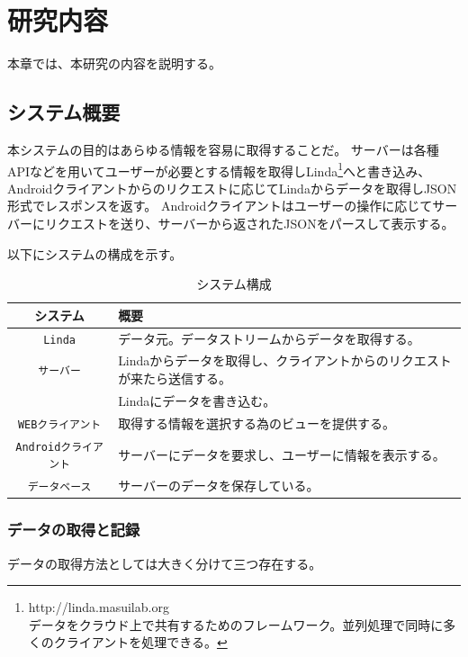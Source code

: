 \chapter{研究内容}
\label{chap:contents}

本章では、本研究の内容を説明する。

\section{システム概要}

本システムの目的はあらゆる情報を容易に取得することだ。
サーバーは各種APIなどを用いてユーザーが必要とする情報を取得しLinda\footnote{http://linda.masuilab.org\\データをクラウド上で共有するためのフレームワーク。並列処理で同時に多くのクライアントを処理できる。}へと書き込み、Androidクライアントからのリクエストに応じてLindaからデータを取得しJSON形式でレスポンスを返す。
Androidクライアントはユーザーの操作に応じてサーバーにリクエストを送り、サーバーから返されたJSONをパースして表示する。

以下にシステムの構成を示す。

\begin{table}[htbp]
  \caption{システム構成}
  \label{tb:files}
  \begin{center}\begin{tabular}{c|l}
    \hline
    システム&概要\\\hline\hline
    {\tt Linda}&データ元。データストリームからデータを取得する。\\\hline
    {\tt サーバー}&Lindaからデータを取得し、クライアントからのリクエストが来たら送信する。\\
                      &Lindaにデータを書き込む。\\\hline
    {\tt WEBクライアント}&取得する情報を選択する為のビューを提供する。\\\hline
    {\tt Androidクライアント}&サーバーにデータを要求し、ユーザーに情報を表示する。\\\hline
    {\tt データベース}&サーバーのデータを保存している。\\\hline
  \end{tabular}\end{center}
\end{table}

\subsection{データの取得と記録}
データの取得方法としては大きく分けて三つ存在する。

